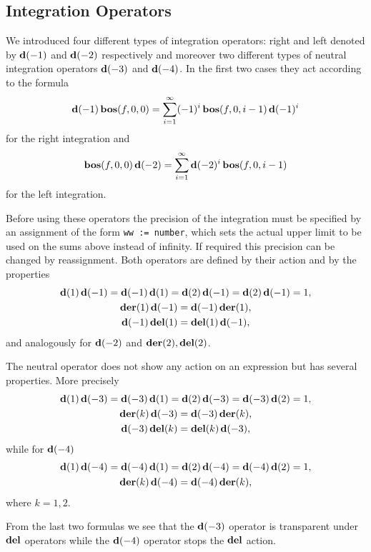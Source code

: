 {\subsection{Integration Operators}

We introduced four different types of integration operators: right and
left denoted by $\mathbf{d}(-1)$ and $\mathbf{d}(-2)$ respectively and moreover two
different types of neutral integration operators $\mathbf{d}(-3)$ and
$\mathbf{d}(-4)$.  In the first two cases they act according to the formula
\begin{equation*}
  \mathbf{d}(-1)\,\mathbf{bos}(f,0,0) =
  \sum_{i=1}^{\infty} (-1)^{i}\,\mathbf{bos}(f,0,i-1)\,\mathbf{d}(-1)^{i}
\end{equation*}
for the right integration and
\begin{equation*}
  \mathbf{bos}(f,0,0)\,\mathbf{d}(-2) =
  \sum_{i=1}^{\infty} \mathbf{d}(-2)^{i}\,\mathbf{bos}(f,0,i-1)
\end{equation*}
for the left integration.

Before using these operators the precision of the integration must be
specified by an assignment of the form \texttt{ww := number}, which
sets the actual upper limit to be used on the sums above instead of
infinity.  If required this precision can be changed by reassignment.
Both operators are defined by their action and by the properties
\begin{gather*}
  \mathbf{d}(1)\,\mathbf{d}(-1)=\mathbf{d}(-1)\,\mathbf{d}(1)=\mathbf{d}(2)\,\mathbf{d}(-1)=\mathbf{d}(2)\,\mathbf{d}(-1)=1, \\
  \mathbf{der}(1)\,\mathbf{d}(-1)=\mathbf{d}(-1)\,\mathbf{der}(1), \\
  \mathbf{d}(-1)\,\mathbf{del}(1)=\mathbf{del}(1)\,\mathbf{d}(-1),
\end{gather*}
and analogously for $\mathbf{d}(-2)$ and $\mathbf{der}(2), \mathbf{del}(2)$.

The neutral operator does not show any action on an expression but has
several properties.  More precisely
\begin{gather*}
  \mathbf{d}(1)\,\mathbf{d}(-3)=\mathbf{d}(-3)\,\mathbf{d}(1)=\mathbf{d}(2)\,\mathbf{d}(-3)=\mathbf{d}(-3)\,\mathbf{d}(2)=1, \\
  \mathbf{der}(k)\,\mathbf{d}(-3)=\mathbf{d}(-3)\,\mathbf{der}(k), \\
  \mathbf{d}(-3)\,\mathbf{del}(k)=\mathbf{del}(k)\,\mathbf{d}(-3),
\end{gather*}
while for $\mathbf{d}(-4)$
\begin{gather*}
  \mathbf{d}(1)\,\mathbf{d}(-4)=\mathbf{d}(-4)\,\mathbf{d}(1)=\mathbf{d}(2)\,\mathbf{d}(-4)=\mathbf{d}(-4)\,\mathbf{d}(2)=1, \\
  \mathbf{der}(k)\,\mathbf{d}(-4)=\mathbf{d}(-4)\,\mathbf{der}(k),
\end{gather*}
where $k=1,2$.

From the last two formulas we see that the $\mathbf{d}(-3)$ operator is
transparent under $\mathbf{del}$ operators while the $\mathbf{d}(-4)$ operator stops
the $\mathbf{del}$ action.

}

